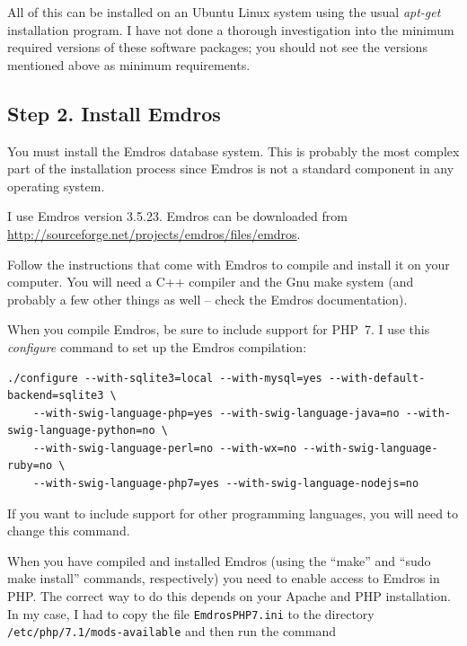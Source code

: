 \documentclass[11pt,oneside,a4paper]{memoir}
\begin{document}
All of this can be installed on an Ubuntu Linux system using the usual \emph{apt-get} installation
program. I have not done a thorough investigation into the minimum required versions of these
software packages; you should not see the versions mentioned above as minimum requirements.



\subsection{Step 2. Install Emdros}\label{sec-install-emdros}

You must install the Emdros database system. This is probably the most complex part of
the installation process since Emdros is not a standard component in any operating system.

I use Emdros version 3.5.23. Emdros can be downloaded from
\url{http://sourceforge.net/projects/emdros/files/emdros}.

Follow the instructions that come with Emdros to compile and install it on your computer. You will
need a C++ compiler and the Gnu make%
system (and probably a few other things as well -- check the Emdros documentation).

When you compile Emdros, be sure to include support for PHP~7. I use this
\emph{configure} command to set up the Emdros compilation:

\begin{lstlisting}
./configure --with-sqlite3=local --with-mysql=yes --with-default-backend=sqlite3 \
    --with-swig-language-php=yes --with-swig-language-java=no --with-swig-language-python=no \
    --with-swig-language-perl=no --with-wx=no --with-swig-language-ruby=no \
    --with-swig-language-php7=yes --with-swig-language-nodejs=no
\end{lstlisting}

If you want to include support for other programming languages, you
will need to change this command.

When you have compiled and installed Emdros (using the ``make'' and ``sudo make install'' commands,
respectively) you need to enable access to Emdros in PHP. The correct way to do this depends on your
Apache and PHP installation. In my case, I had to copy the file
\texttt{EmdrosPHP7.ini} to the directory \texttt{/etc/php/7.1/mods-available} and then run the
command
\end{document}

